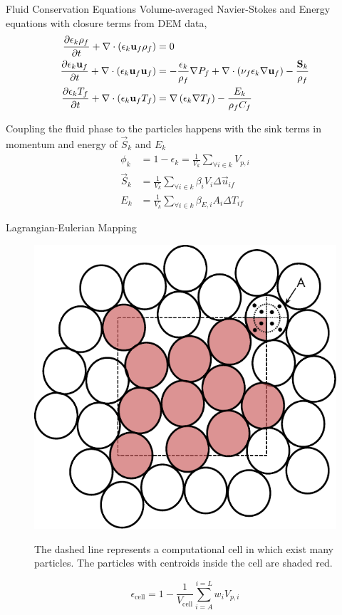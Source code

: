 \begin{frame}{Fluid Conservation Equations}
Volume-averaged Navier-Stokes and Energy equations with closure terms from DEM data,
\begin{subequations}\label{eq:cfd-equations}
\begin{align}
\pder[\epsilon_k \rho_f]{t} + \nabla\cdot(\epsilon_k \vec{u}_f \rho_f) &= 0\\
\pder[\epsilon_k \vec{u}_f]{t} + \nabla\cdot(\epsilon_k \vec{u}_f \vec{u}_f) &= -\frac{\epsilon_k}{\rho_f}\nabla P_f + \nabla\cdot\left(\nu_f\epsilon_k\nabla \vec{u}_f\right) - \frac{\vec{S}_k}{\rho_f}\\
\pder[\epsilon_k T_f]{t} + \nabla\cdot(\epsilon_k \vec{u}_f T_f) &= \nabla\left(\epsilon_k\nabla T_f\right)-\frac{E_k}{\rho_fC_f}
\end{align}
\end{subequations}

Coupling the fluid phase to the particles happens with the sink terms in momentum and energy of $\vec{S}_k$ and $E_k$
\begin{subequations}\label{eq:cfd-sources}
\begin{align}
	\phi_k &= 1- \epsilon_k = \frac{1}{V_k}\sum_{\forall i \in k} V_{p,i}\\
	\vec{S}_k &= \frac{1}{V_k}\sum_{\forall i \in k} \beta_i V_i \Delta \vec{u}_{if} \label{eq:cfd-mom-source}\\
	E_k &= \frac{1}{V_k}\sum_{\forall i \in k} \beta_{E,i} A_i \Delta T_{if}
\end{align}
\end{subequations}
\end{frame}

\begin{frame}{Lagrangian-Eulerian Mapping}
\begin{figure}[t]
	\centering
	\includegraphics[width=0.5\linewidth]{chapters/figures/void-fraction-divided-cell.pdf}\label{fig:centroid-void-fraction-divided}
	\caption{The dashed line represents a computational cell in which exist many particles. The particles with centroids inside the cell are shaded red.}
\end{figure}
\begin{equation}
	\epsilon_\text{cell} = 1-\frac{1}{V_\text{cell}}\sum_{i = A}^{i=L}w_iV_{p,i}
\end{equation}
\end{frame}